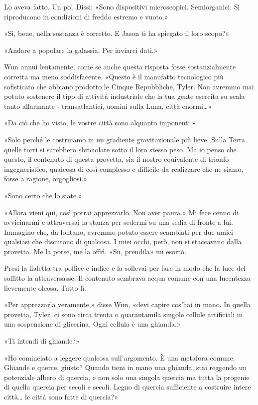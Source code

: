 Lo aveva fatto. Un po'. Dissi: «Sono dispositivi microscopici.
Semiorganici. Si riproducono in condizioni di freddo estremo e vuoto.»

«Sì, bene, nella sostanza è corretto. E Jason ti ha spiegato il loro
scopo?»

«Andare a popolare la galassia. Per inviarci dati.»

Wun annuì lentamente, come se anche questa risposta fosse
sostanzialmente corretta ma meno soddisfacente. «Questo è il manufatto
tecnologico più sofisticato che abbiano prodotto le Cinque Repubbliche,
Tyler. Non avremmo mai potuto sostenere il tipo di attività industriale
che la tua gente esercita su scala tanto allarmante - transatlantici,
uomini sulla Luna, città enormi\ldots»

«Da ciò che ho visto, le vostre città sono alquanto imponenti.»

«Solo perché le costruiamo in un gradiente gravitazionale più lieve.
Sulla Terra quelle torri si sarebbero sbriciolate sotto il loro stesso
peso. Ma io penso che questo, il contenuto di questa provetta, sia il
nostro equivalente di trionfo ingegneristico, qualcosa di così complesso
e difficile da realizzare che ne siamo, forse a ragione, orgogliosi.»

«Sono certo che lo siate.»

«Allora vieni qui, così potrai apprezzarlo. Non aver paura.» Mi fece
cenno di avvicinarmi e attraversai la stanza per sedermi su una sedia di
fronte a lui. Immagino che, da lontano, avremmo potuto essere scambiati
per due amici qualsiasi che discutono di qualcosa. I miei occhi, però,
non si staccavano dalla provetta. Me la porse, me la offrì. «Su,
prendila» mi esortò.

Presi la fialetta tra pollice e indice e la sollevai per fare in modo
che la luce del soffitto la attraversasse. Il contenuto sembrava acqua
comune con una lucentezza lievemente oleosa. Tutto lì.

«Per apprezzarla veramente,» disse Wun, «devi capire cos'hai in mano. In
quella provetta, Tyler, ci sono circa trenta o quarantamila singole
cellule artificiali in una sospensione di glicerina. Ogni cellula è una
ghianda.»

«Ti intendi di ghiande?»

«Ho cominciato a leggere qualcosa sull'argomento. È una metafora comune.
Ghiande e querce, giusto? Quando tieni in mano una ghianda, stai
reggendo un potenziale albero di quercia, e non solo una singola quercia
ma tutta la progenie di quella quercia per secoli e secoli. Legno di
quercia sufficiente a costruire intere città\ldots{} le città sono fatte
di quercia?»

